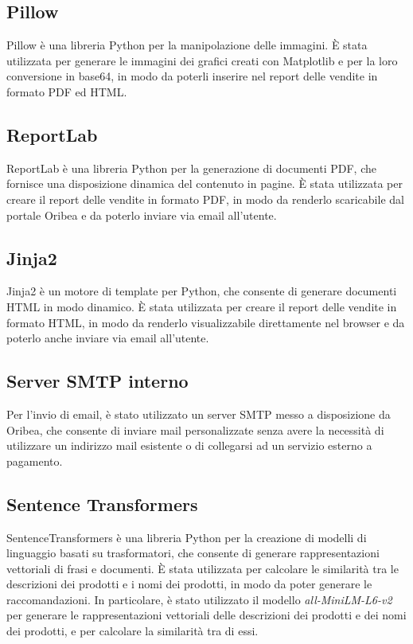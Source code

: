 \subsection{Pillow}
Pillow è una libreria Python per la manipolazione delle immagini. È stata utilizzata per generare le immagini dei grafici creati con Matplotlib e per la loro conversione in base64, in modo da poterli inserire nel report delle vendite in formato PDF ed HTML.

\subsection{ReportLab}
ReportLab è una libreria Python per la generazione di documenti PDF, che fornisce una disposizione dinamica del contenuto in pagine. È stata utilizzata per creare il report delle vendite in formato PDF, in modo da renderlo scaricabile dal portale Oribea e da poterlo inviare via email all'utente.

\subsection{Jinja2}
Jinja2 è un motore di template per Python, che consente di generare documenti HTML in modo dinamico. È stata utilizzata per creare il report delle vendite in formato HTML, in modo da renderlo visualizzabile direttamente nel browser e da poterlo anche inviare via email all'utente.

\subsection{Server SMTP interno}
Per l'invio di email, è stato utilizzato un server SMTP messo a disposizione da Oribea, che consente di inviare mail personalizzate senza avere la necessità di utilizzare un indirizzo mail esistente o di collegarsi ad un servizio esterno a pagamento. 

\subsection{Sentence Transformers}
SentenceTransformers è una libreria Python per la creazione di modelli di linguaggio basati su trasformatori, che consente di generare rappresentazioni vettoriali di frasi e documenti. È stata utilizzata per calcolare le similarità tra le descrizioni dei prodotti e i nomi dei prodotti, in modo da poter generare le raccomandazioni. In particolare, è stato utilizzato il modello \emph{all-MiniLM-L6-v2} per generare le rappresentazioni vettoriali delle descrizioni dei prodotti e dei nomi dei prodotti, e per calcolare la similarità tra di essi.

